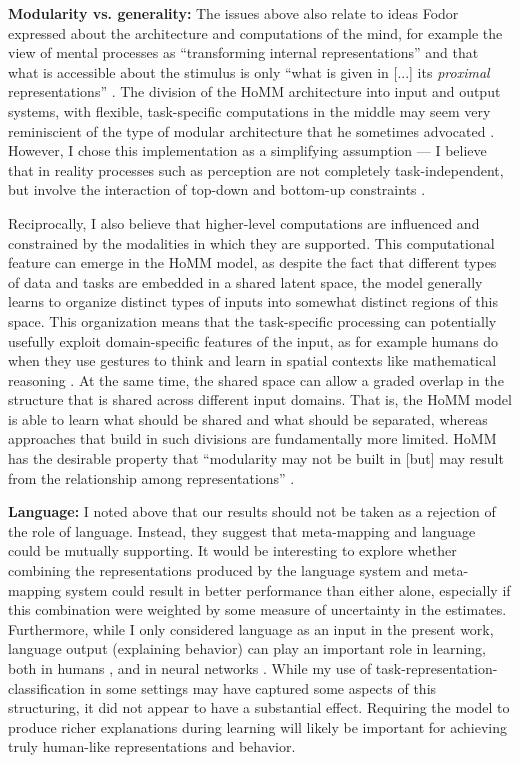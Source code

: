 \textbf{Modularity vs. generality:} The issues above also relate to ideas Fodor expressed about the architecture and computations of the mind, for example the view of mental processes as ``transforming internal representations'' and that what is accessible about the stimulus is only ``what is given in [...] its \emph{proximal} representations'' \citep[][pp. 200-201]{fodor1975language}. The division of the HoMM architecture into input and output systems, with flexible, task-specific computations in the middle may seem very reminiscient of the type of modular architecture that he sometimes advocated \citep{Fodor1983modularity}. However, I chose this implementation as a simplifying assumption --- I believe that in reality processes such as perception are not completely task-independent, but involve the interaction of top-down and bottom-up constraints \citep{McClelland2014}. \par

Reciprocally, I also believe that higher-level computations are influenced and constrained by the modalities in which they are supported. This computational feature can emerge in the HoMM model, as despite the fact that different types of data and tasks are embedded in a shared latent space, the model generally learns to organize distinct types of inputs into somewhat distinct regions of this space. This organization means that the task-specific processing can potentially usefully exploit domain-specific features of the input, as for example humans do when they use gestures to think and learn in spatial contexts like mathematical reasoning \citep{Goldin-Meadow1999, Wakefield2018}. At the same time, the shared space can allow a graded overlap in the structure that is shared across different input domains. That is, the HoMM model is able to learn what should be shared and what should be separated, whereas approaches that build in such divisions are fundamentally more limited. HoMM has the desirable property that ``modularity may not be built in [but] may result from the relationship among representations'' \citep{Tanenhaus1987}.\par

\textbf{Language:} I noted above that our results should not be taken as a rejection of the role of language. Instead, they suggest that meta-mapping and language could be mutually supporting. It would be interesting to explore whether combining the representations produced by the language system and meta-mapping system could result in better performance than either alone, especially if this combination were weighted by some measure of uncertainty in the estimates. Furthermore, while I only considered language as an input in the present work, language output (explaining behavior) can play an important role in learning, both in humans \citep{Chi1994}, and in neural networks \citep{Mu2019}. While my use of task-representation-classification in some settings may have captured some aspects of this structuring, it did not appear to have a substantial effect. Requiring the model to produce richer explanations during learning will likely be important for achieving truly human-like representations and behavior. 

